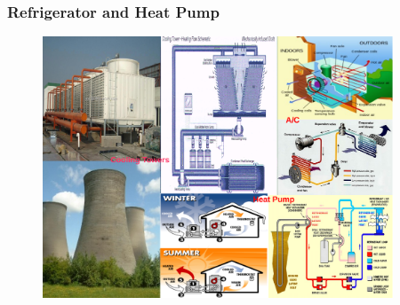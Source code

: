 \documentclass[10pt,compress]{beamer}
\begin{document}
\begin{frame}
 \frametitle{Refrigerator and Heat Pump}
    \begin{figure}%
     \begin{center}
      \includegraphics[width=12.cm,height=7.8cm]{./Pics/Overview_Refrig3}
     \end{center}
    \end{figure}
\end{frame}
\end{document}
